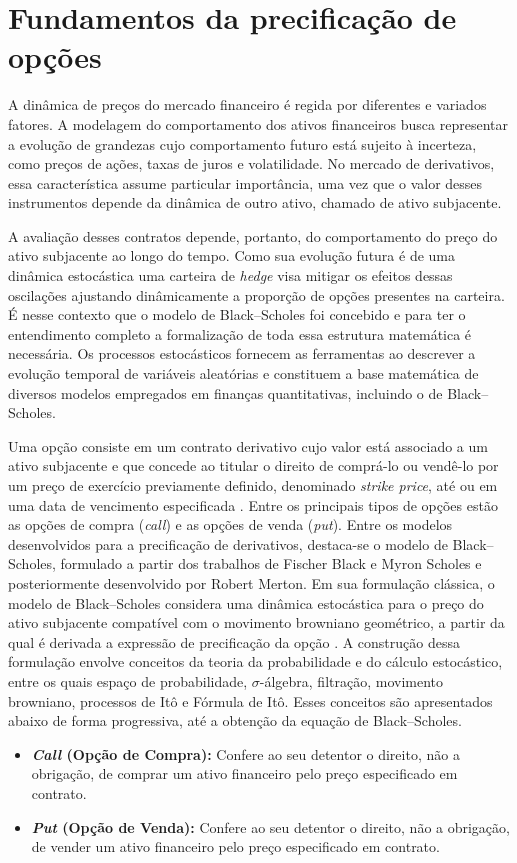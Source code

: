 \section{Fundamentos da precificação de opções}
\label{chapter:chapterName}

A dinâmica de preços do mercado financeiro é regida por diferentes e variados fatores. A modelagem do comportamento dos ativos financeiros busca representar a evolução de grandezas cujo comportamento futuro está sujeito à incerteza, como preços de ações, taxas de juros e volatilidade. No mercado de derivativos, essa característica assume particular importância, uma vez que o valor desses instrumentos depende da dinâmica de outro ativo, chamado de ativo subjacente.

A avaliação desses contratos depende, portanto, do comportamento do preço do ativo subjacente ao longo do tempo. Como sua evolução futura é de uma dinâmica estocástica uma carteira de \textit{hedge} visa mitigar os efeitos dessas oscilações ajustando dinâmicamente a proporção de opções presentes na carteira. É nesse contexto que o modelo de Black--Scholes foi concebido e para ter o entendimento completo a formalização de toda essa estrutura matemática é necessária. Os processos estocásticos fornecem as ferramentas ao descrever a evolução temporal de variáveis aleatórias e constituem a base matemática de diversos modelos empregados em finanças quantitativas, incluindo o de Black--Scholes.

Uma opção consiste em um contrato derivativo cujo valor está associado
a um ativo subjacente e que concede ao titular o direito de comprá-lo
ou vendê-lo por um preço de exercício previamente definido, denominado \textit{strike price}, até ou em uma data de vencimento especificada \cite{blackscholes1973}. Entre os principais tipos de opções estão as opções de compra (\textit{call}) e as opções de venda (\textit{put}). 
Entre os modelos desenvolvidos para a precificação de derivativos, destaca-se o modelo de Black--Scholes, formulado a partir dos trabalhos de Fischer Black e Myron Scholes e posteriormente desenvolvido por Robert Merton. Em sua formulação clássica, o modelo de Black--Scholes considera uma
dinâmica estocástica para o preço do ativo subjacente compatível com o
movimento browniano geométrico, a partir da qual é derivada a expressão
de precificação da opção \cite{blackscholes1973}. A construção dessa formulação envolve conceitos da teoria da probabilidade e do cálculo estocástico, entre os quais espaço de probabilidade, $\sigma$-álgebra, filtração, movimento browniano, processos de Itô e Fórmula de Itô. Esses conceitos são apresentados abaixo de forma progressiva, até a obtenção da equação de Black--Scholes.
\begin{itemize}
    \item \textbf{\textit{Call} (Opção de Compra):} Confere ao seu detentor o direito, não a obrigação, de comprar um ativo financeiro pelo preço especificado em contrato.
    \item \textbf{\textit{Put} (Opção de Venda):} Confere ao seu detentor o direito, não a obrigação, de vender um ativo financeiro pelo preço especificado em contrato.
\end{itemize}

